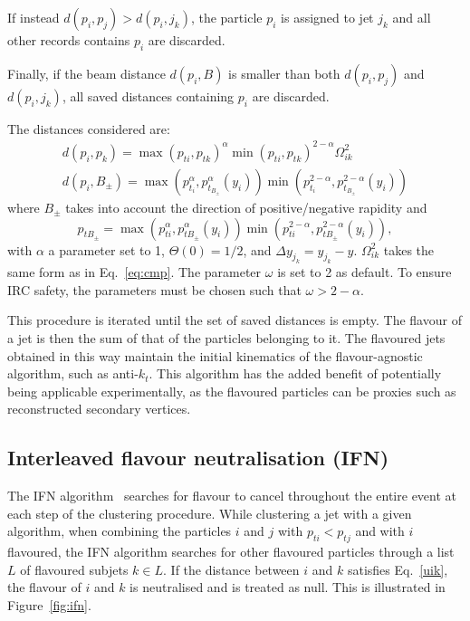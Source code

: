 \documentclass[10pt,a4paper]{book}
\begin{document}
If instead $d(p_i, p_j) > d(p_i, j_k)$, the particle $p_i$ is assigned to jet $j_k$ and all other records contains $p_i$ are discarded.

Finally, if the beam distance $d(p_i, B)$ is smaller than both $d(p_i, p_j)$ and $d(p_i, j_k)$, all saved distances containing $p_i$ are discarded.

The distances considered are:
\begin{gather}
    \label{uik}
    d(p_i, p_k) = \max(p_{ti}, p_{tk})^{\alpha} \min(p_{ti}, p_{tk})^{2-\alpha} \Omega_{ik}^2 \\
    d(p_i, B_{\pm}) = \max \left( p_{t_i}^{\alpha}, p_{t_{B_{\pm}}}^{\alpha}(y_i) \right) \min \left( p_{t_i}^{2-\alpha}, p_{t_{B_{\pm}}}^{2-\alpha}(y_i) \right)
\end{gather}
where $B_\pm$ takes into account the direction of positive/negative rapidity and
\begin{equation}
    p_{tB_\pm} = \max\left(p_{ti}^\alpha, p_{tB_\pm}^\alpha(y_i)\right)\min\left(p_{ti}^{2-\alpha}, p_{tB_\pm}^{2-\alpha}(y_i)\right),
\end{equation}
with $\alpha$ a parameter set to 1, $\Theta(0) = 1/2$,  and $\Delta y_{j_k} = y_{j_k} - y$. $\Omega^2_{ik}$ takes the same form as in Eq.~\ref{eq:cmp}. The parameter $\omega$ is set to 2 as default. To ensure IRC safety, the parameters must be chosen such that $\omega > 2 - \alpha$.

This procedure is iterated until the set of saved distances is empty. The flavour of a jet is then the sum of that of the particles belonging to it. The flavoured jets obtained in this way maintain the initial kinematics of the flavour-agnostic algorithm, such as anti-$k_t$. This algorithm has the added benefit of potentially being applicable experimentally, as the flavoured particles can be proxies such as reconstructed secondary vertices.

\subsection{Interleaved flavour neutralisation (IFN)}

The IFN algorithm~\cite{Caola:2023wpj} searches for flavour to cancel throughout the entire event at each step of the clustering procedure. While clustering a jet with a given algorithm, when combining the particles $i$ and $j$ with $p_{ti} < p_{tj}$ and with $i$ flavoured, the IFN algorithm searches for other flavoured particles through a list $L$ of flavoured subjets $k \in L$. If the distance between $i$ and $k$ satisfies Eq.~\ref{uik}, the flavour of $i$ and $k$ is neutralised and is treated as null. This is illustrated in Figure~\ref{fig:ifn}.
\end{document}
